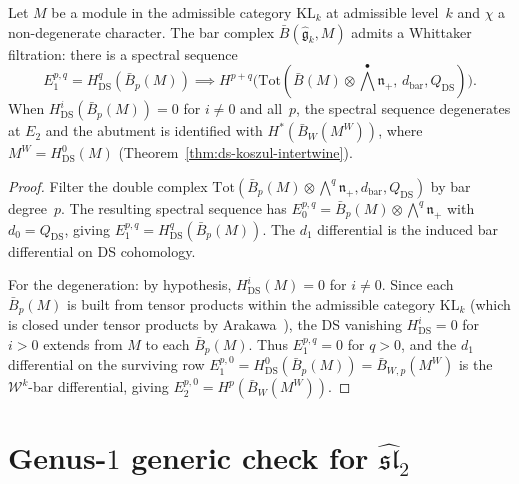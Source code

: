 \begin{proposition}
\label{prop:bar-whittaker}
Let $M$ be a module in the admissible category
$\mathrm{KL}_k$ at admissible level~$k$ and
$\chi$ a non-degenerate character.
The bar complex $\bar{B}(\widehat{\mathfrak{g}}_k, M)$
admits a Whittaker filtration: there is a spectral sequence
\begin{equation}\label{eq:whittaker-ss}
E_1^{p,q} = H^q_{\mathrm{DS}}(\bar{B}_p(M))
\implies H^{p+q}\bigl(\mathrm{Tot}(\bar{B}(M) \otimes
\textstyle\bigwedge^\bullet \mathfrak{n}_+,\,
d_{\mathrm{bar}}, Q_{\mathrm{DS}})\bigr).
\end{equation}
When $H^i_{\mathrm{DS}}(\bar{B}_p(M)) = 0$ for $i \neq 0$
and all~$p$, the spectral sequence degenerates at $E_2$
and the abutment is identified with $H^*(\bar{B}_W(M^W))$,
where $M^W = H^0_{\mathrm{DS}}(M)$
\textup{(}Theorem~\textup{\ref{thm:ds-koszul-intertwine})}.
\end{proposition}

\begin{proof}
Filter the double complex
$\mathrm{Tot}(\bar{B}_p(M) \otimes \bigwedge^q \mathfrak{n}_+,
d_{\mathrm{bar}}, Q_{\mathrm{DS}})$ by bar degree~$p$.
The resulting spectral sequence has $E_0^{p,q} =
\bar{B}_p(M) \otimes \bigwedge^q \mathfrak{n}_+$ with
$d_0 = Q_{\mathrm{DS}}$, giving $E_1^{p,q} =
H^q_{\mathrm{DS}}(\bar{B}_p(M))$. The $d_1$ differential is
the induced bar differential on DS cohomology.

For the degeneration: by hypothesis,
$H^i_{\mathrm{DS}}(M) = 0$ for $i \neq 0$. Since each
$\bar{B}_p(M)$ is built from tensor products within the
admissible category $\mathrm{KL}_k$ (which is closed under
tensor products by Arakawa~\cite{Arakawa17}),
the DS vanishing $H^i_{\mathrm{DS}} = 0$ for $i > 0$ extends
from $M$ to each $\bar{B}_p(M)$. Thus $E_1^{p,q} = 0$ for
$q > 0$, and the $d_1$ differential on the surviving row
$E_1^{p,0} = H^0_{\mathrm{DS}}(\bar{B}_p(M)) = \bar{B}_{W,p}(M^W)$
is the $\mathcal{W}^k$-bar differential, giving
$E_2^{p,0} = H^p(\bar{B}_W(M^W))$.
\end{proof}

\section{\texorpdfstring{Genus-$1$ generic check for $\widehat{\mathfrak{sl}}_2$}{Genus-1 generic check for sl-2}}
\label{sec:sl2-genus-one-computation}

